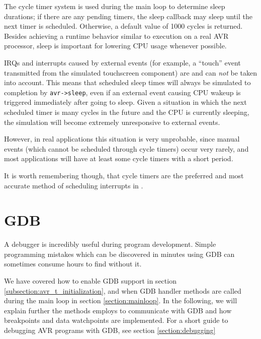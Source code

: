 The cycle timer system is used during the main loop to determine sleep durations;
if there are any pending timers, the sleep callback may sleep until the next timer
is scheduled. Otherwise, a default value of 1000 cycles is returned.
Besides achieving a runtime behavior similar to execution on a real \ac{AVR}
processor, sleep is important for lowering \simavr \ac{CPU} usage whenever possible.

\acp{IRQ} and interrupts caused by external events (for example, a ``touch'' event transmitted
from the simulated touchscreen component) are and can \emph{not} be taken into
account.
This means that scheduled sleep times will always be simulated to completion by
\lstinline|avr->sleep|, even if an external event causing \ac{CPU} wakeup is
triggered immediately after going to sleep.
Given a situation in which the next scheduled timer is many cycles in the future
and the \ac{CPU} is currently sleeping, the simulation will become extremely
unresponsive to external events.

However, in real applications this situation is very unprobable, since
manual events (which cannot be scheduled through cycle timers) occur very rarely,
and most applications will have at least some cycle timers with a short period.

It is worth remembering though, that cycle timers are the preferred and most
accurate method of scheduling interrupts in \simavr.


\section{\acf{GDB}}

A debugger is incredibly useful during program development. Simple programming mistakes
which can be discovered in minutes using \ac{GDB} can sometimes consume hours
to find without it.

We have covered how to enable \ac{GDB} support in section
\ref{subsection:avr_t_initialization}, and when \ac{GDB} handler methods are
called during the main loop in section \ref{section:mainloop}. In the following,
we will explain further the methods \simavr employs to communicate with
\ac{GDB} and how breakpoints and data watchpoints are implemented. For
a short guide to debugging \ac{AVR} programs with \ac{GDB}, see section
\ref{section:debugging}

